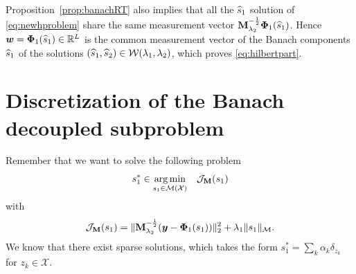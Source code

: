     Proposition~\ref{prop:banachRT} also implies that all the $\widehat{s}_1$ solution of \eqref{eq:newhproblem} share the same measurement vector $\mathbf{M}_{\lambda_{2}}^{-\frac{1}{2}} {\bm{\Phi}_1} (\widehat{s}_1)$. Hence $\bm{w} = {\bm{\Phi}_1}(\widehat{s}_1) \in \mathbb{R}^L$ is the common measurement vector of the Banach components $\widehat{s}_1$ of the solutions $(\widehat{s}_1 , \widehat{s}_2) \in \mathcal{W} (\lambda_{1},\lambda_{2})$, which proves \eqref{eq:hilbertpart}.

    

\clearpage
\section{Discretization of the Banach decoupled subproblem}
    \label{app:discretization}
        Remember that we want to solve the following problem
        $$s_1^* \in \underset{ s_1\in{\mathcal{M}}({\mathcal{X}})}{\arg\min} \quad \mathcal{J}_{\mathbf{M}}(s_1)$$
        with
        $$\mathcal{J}_{\mathbf{M}}(s_1)= \|\mathbf{M}_{\lambda_{2}}^{-\frac{1}{2}} ( \bm{y} - {\bm{\Phi}_1}(s_1)  ) \|_2^2  + \lambda_{1} \| s_1 \|_{\mathcal{M}}.$$
        We know that there exist sparse solutions, which takes the form $s_1^* = \sum_k \alpha_k \delta_{z_k}$ for $z_k\in\mathcal{X}$.

